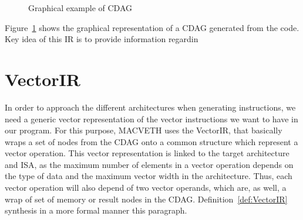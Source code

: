\begin{figure}[h]
	\centering
{}
\caption{Graphical example of CDAG}
\label{fig:GraphCDAG}
\end{figure}

Figure~\ref{fig:GraphCDAG} shows the graphical representation of a CDAG 
generated from the code. Key idea of this IR is to provide information 
regardin

\section{VectorIR}
In order to approach the different architectures when generating instructions,
we need a generic vector representation of the vector instructions we want to
have in our program. For this purpose, MACVETH uses the VectorIR, that basically
wraps a set of nodes from the CDAG onto a common structure which represent a 
vector operation. This vector representation is linked to the target 
architecture and ISA, as the maximum number of elements in a vector operation 
depends on the type of data and the maximum vector width in the architecture. 
Thus, each vector operation will also depend of two vector operands, which are, 
as well, a wrap of set of memory or result nodes in the CDAG. 
Definition~\ref{def:VectorIR} synthesis in a more formal manner this paragraph.

